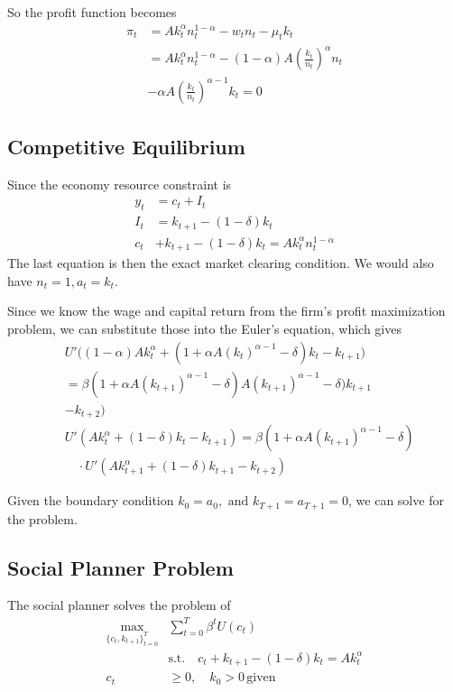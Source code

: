 \documentclass[twocolumn, fleqn]{article}
\begin{document}
	So the profit function becomes 
	\begin{align*}
		\pi_t &= Ak_t^\alpha n_t^{1-\alpha} - w_t n_t - \mu_t k_t \\
	&= Ak_t^\alpha n_t^{1-\alpha} - (1 - \alpha)A \left(\frac{k_t}{n_t}\right)^\alpha n_t \\
	&- \alpha A \left(\frac{k_t}{n_t}\right)^{\alpha-1} k_t = 0
	\end{align*}
	
	\subsection{Competitive Equilibrium}
	Since the economy resource constraint is 
	\begin{align*}
		y_t &= c_t + I_t\\
		I_t &= k_{t+1} - (1-\delta)k_t\\
		c_t &+ k_{t+1} - (1-\delta)k_t = Ak_t^\alpha n_t^{1-\alpha}
	\end{align*}
	The last equation is then the exact market clearing condition. We would also have $n_t=1, a_t = k_t$.
	
	Since we know the wage and capital return from the firm's profit maximization problem, we can substitute those into the Euler's equation, which gives
	\begin{align*}
	&U'\big((1 - \alpha)A k_t^\alpha + (1 + \alpha A(k_t)^{\alpha-1} - \delta)k_t - k_{t+1}\big) \\
	&= \beta (1 + \alpha A(k_{t+1})^{\alpha-1} - \delta) A(k_{t+1})^{\alpha-1} - \delta)k_{t+1}\\& - k_{t+2}\big) \\[10pt]
	&U'(A k_t^\alpha + (1 - \delta)k_t - k_{t+1}) 
	= \beta (1 + \alpha A(k_{t+1})^{\alpha-1} - \delta) \\
	&\quad \cdot U'(A k_{t+1}^\alpha + (1 - \delta)k_{t+1} - k_{t+2})
	\end{align*}
	
	Given the boundary condition $k_0 = a_0, \text{ and } k_{T+1}=a_{T+1} = 0$, we can solve for the problem.
	
	\subsection{Social Planner Problem}
	The social planner solves the problem of 
	\begin{align*}
	\max_{\{c_t, k_{t+1}\}_{t=0}^T} &\sum_{t=0}^T \beta^t U(c_t) \\
	&\text{s.t.} \quad c_t + k_{t+1} - (1 - \delta)k_t = A k_t^\alpha \\
	c_t &\geq 0, \quad k_0 > 0 \, \text{given}
	\end{align*}
	
\end{document}

